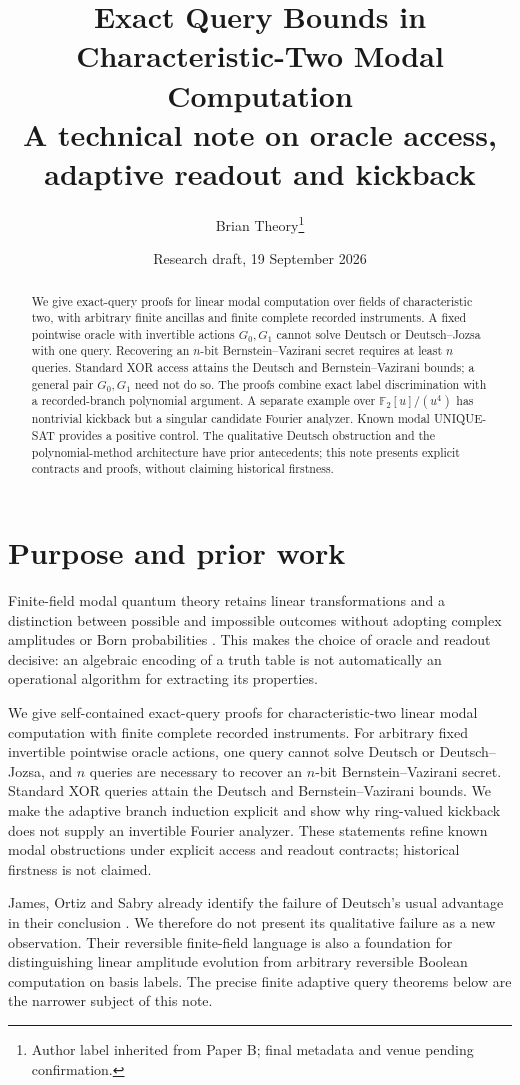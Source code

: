 \documentclass[11pt]{article}
\title{Exact Query Bounds in Characteristic-Two Modal Computation\\\large A technical note on oracle access, adaptive readout and kickback}
\author{Brian Theory\thanks{Author label inherited from Paper B; final metadata and venue pending confirmation.}}
\date{Research draft, 19 September 2026}
\newcommand{\F}{\mathbb F}
\begin{document}
\maketitle
\begin{abstract}
We give exact-query proofs for linear modal computation over fields of characteristic two, with arbitrary finite ancillas and finite complete recorded instruments. A fixed pointwise oracle with invertible actions $G_0,G_1$ cannot solve Deutsch or Deutsch--Jozsa with one query. Recovering an $n$-bit Bernstein--Vazirani secret requires at least $n$ queries. Standard XOR access attains the Deutsch and Bernstein--Vazirani bounds; a general pair $G_0,G_1$ need not do so. The proofs combine exact label discrimination with a recorded-branch polynomial argument. A separate example over $\F_2[u]/(u^4)$ has nontrivial kickback but a singular candidate Fourier analyzer. Known modal UNIQUE-SAT provides a positive control. The qualitative Deutsch obstruction and the polynomial-method architecture have prior antecedents; this note presents explicit contracts and proofs, without claiming historical firstness.
\end{abstract}

\section{Purpose and prior work}
Finite-field modal quantum theory retains linear transformations and a distinction between possible and impossible outcomes without adopting complex amplitudes or Born probabilities \cite{Schumacher2010,Schumacher2012}. This makes the choice of oracle and readout decisive: an algebraic encoding of a truth table is not automatically an operational algorithm for extracting its properties.

We give self-contained exact-query proofs for characteristic-two linear modal computation with finite complete recorded instruments. For arbitrary fixed invertible pointwise oracle actions, one query cannot solve Deutsch or Deutsch--Jozsa, and $n$ queries are necessary to recover an $n$-bit Bernstein--Vazirani secret. Standard XOR queries attain the Deutsch and Bernstein--Vazirani bounds. We make the adaptive branch induction explicit and show why ring-valued kickback does not supply an invertible Fourier analyzer. These statements refine known modal obstructions under explicit access and readout contracts; historical firstness is not claimed.

James, Ortiz and Sabry already identify the failure of Deutsch's usual advantage in their conclusion \cite{James2011}. We therefore do not present its qualitative failure as a new observation. Their reversible finite-field language is also a foundation for distinguishing linear amplitude evolution from arbitrary reversible Boolean computation on basis labels. The precise finite adaptive query theorems below are the narrower subject of this note.
\end{document}
